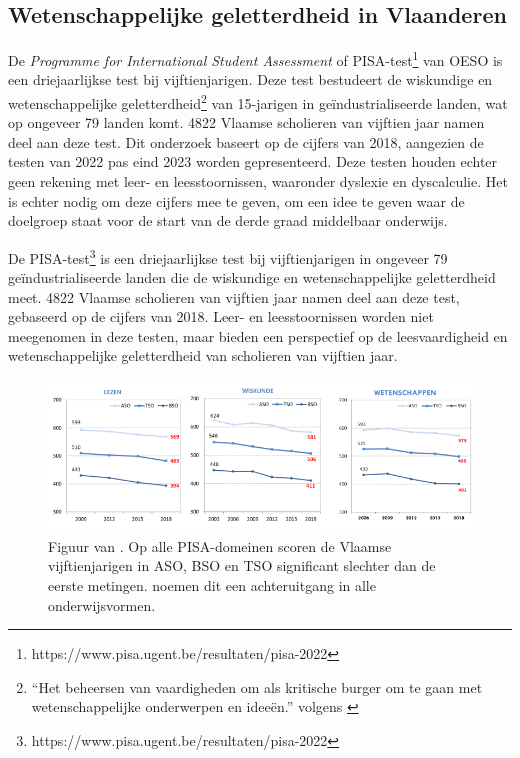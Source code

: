 \subsection{Wetenschappelijke geletterdheid in Vlaanderen}

De \textit{Programme for International Student Assessment} of PISA-test\footnote{https://www.pisa.ugent.be/resultaten/pisa-2022} van OESO is een driejaarlijkse test bij vijftienjarigen. Deze test bestudeert de wiskundige en wetenschappelijke geletterdheid\footnote{“Het beheersen van vaardigheden om als kritische burger om te gaan met wetenschappelijke onderwerpen en ideeën.” volgens \textcite{DeMeyer2019}} van 15-jarigen in geïndustrialiseerde landen, wat op ongeveer 79 landen komt. 4822 Vlaamse scholieren van vijftien jaar namen deel aan deze test. Dit onderzoek baseert op de cijfers van 2018, aangezien de testen van 2022 pas eind 2023 worden gepresenteerd. Deze testen houden echter geen rekening met leer- en leesstoornissen, waaronder dyslexie en dyscalculie. Het is echter nodig om deze cijfers mee te geven, om een idee te geven waar de doelgroep staat voor de start van de derde graad middelbaar onderwijs. 

De PISA-test\footnote{https://www.pisa.ugent.be/resultaten/pisa-2022} is een driejaarlijkse test bij vijftienjarigen in ongeveer 79 geïndustrialiseerde landen die de wiskundige en wetenschappelijke geletterdheid meet. 4822 Vlaamse scholieren van vijftien jaar namen deel aan deze test, gebaseerd op de cijfers van 2018. Leer- en leesstoornissen worden niet meegenomen in deze testen, maar bieden een perspectief op de leesvaardigheid en wetenschappelijke geletterdheid van scholieren van vijftien jaar.

\begin{figure}[H]
	\begin{center}
		\includegraphics[width=\linewidth]{img/oeso-graphic-pisa-trend-samenvatting.png}
	\end{center}
	\caption{Figuur van \textcite{DeMeyer2019}. Op alle PISA-domeinen scoren de Vlaamse vijftienjarigen in ASO, BSO en TSO significant slechter dan de eerste metingen. \textcite{DeMeyer2019} noemen dit een achteruitgang in alle onderwijsvormen.}
\end{figure}

